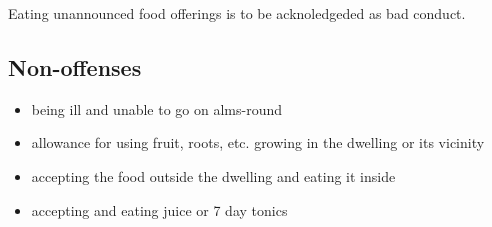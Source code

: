 Eating unannounced food offerings is to be acknoledgeded as bad conduct.

\subsection{Non-offenses}

\begin{itemize}
\tightlist
\item
  being ill and unable to go on alms-round
\item
  allowance for using fruit, roots, etc. growing in the dwelling or its
  vicinity
\item
  accepting the food outside the dwelling and eating it inside
\item
  accepting and eating juice or 7 day tonics
\end{itemize}

